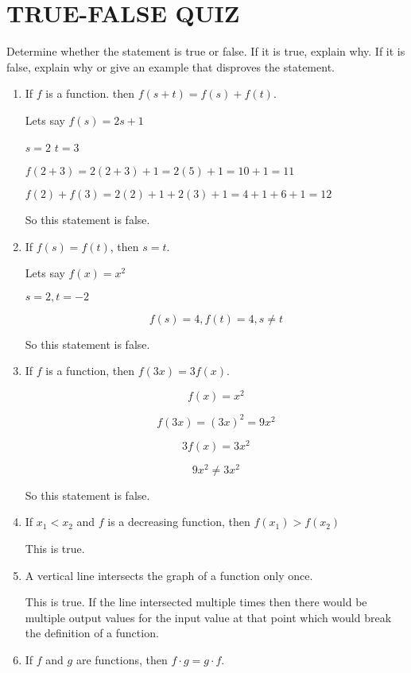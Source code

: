\documentclass{article}
\begin{document}
\section{TRUE-FALSE QUIZ}

Determine whether the statement is true or false. If it is true, explain
why. If it is false, explain why or give an example that disproves the
statement.

\begin{enumerate}
	\item If $f$ is a function. then $f(s + t) = f(s) + f(t)$.

	Lets say $f(s) = 2s + 1$

	$s = 2$
	$t = 3$

	$f(2 + 3) = 2(2 + 3) + 1 = 2(5) + 1 = 10 + 1 = 11$

	$f(2) + f(3) = 2(2) + 1 + 2(3) + 1 = 4 + 1 + 6 + 1 = 12$

	So this statement is false.

	\item If $f(s) = f(t)$, then $s = t$.

	Lets say $f(x) = x^2$

	$s = 2, t = -2$

	$$f(s) = 4, f(t) = 4, s \ne t$$

	So this statement is false.

	\item If $f$ is a function, then $f(3x) = 3f(x)$.

	$$f(x) = x^2$$

	$$f(3x) = (3x)^2 = 9x^2$$

	$$3f(x) = 3x^2$$

	$$9x^2 \ne 3x^2$$

	So this statement is false.

	\item If $x_1 < x_2$ and $f$ is a decreasing function, then
		$f(x_1) > f(x_2)$

		This is true.

	\item A vertical line intersects the graph of a function only once.

		This is true. If the line intersected multiple times then
		there would be multiple output values for the input value
		at that point which would break the definition of a function.

	\item If $f$ and $g$ are functions, then $f \cdot g = g \cdot f$.


\end{enumerate}
\end{document}
